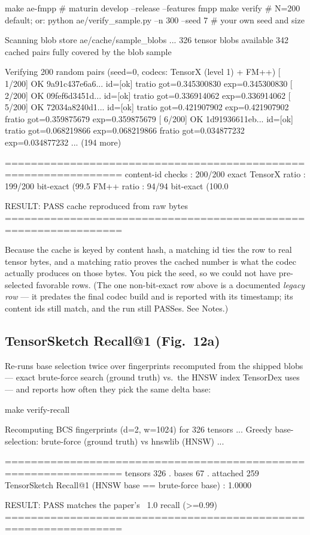 \documentclass[11pt]{article}
\begin{document}
\begin{shell}
make ae-fmpp             # maturin develop --release --features fmpp
make verify              # N=200 default; or:
python ae/verify_sample.py --n 300 --seed 7     # your own seed and size
\end{shell}
\begin{term}
Scanning blob store ae/cache/sample_blobs ...
  326 tensor blobs available
  342 cached pairs fully covered by the blob sample

Verifying 200 random pairs (seed=0, codecs: TensorX (level 1) + FM++)
  [  1/200] OK  9a91c437e6a6...  id=[ok]  tratio got=0.345300830 exp=0.345300830
  [  2/200] OK  09fef6d3451d...  id=[ok]  tratio got=0.336914062 exp=0.336914062
  [  5/200] OK  72034a8240d1...  id=[ok]  tratio got=0.421907902 exp=0.421907902
                                          fratio got=0.359875679 exp=0.359875679
  [  6/200] OK  1d91936611eb...  id=[ok]  tratio got=0.068219866 exp=0.068219866
                                          fratio got=0.034877232 exp=0.034877232
  ... (194 more)

================================================================
content-id checks : 200/200 exact
TensorX ratio     : 199/200 bit-exact (99.5%
FM++ ratio        : 94/94 bit-exact (100.0%

RESULT: PASS  cache reproduced from raw bytes
================================================================
\end{term}

Because the cache is keyed by content hash, a matching id ties the row to
real tensor bytes, and a matching ratio proves the cached number is what the
codec actually produces on those bytes. You pick the seed, so we could not
have pre-selected favorable rows. (The one non-bit-exact row above is a
documented \emph{legacy row} --- it predates the final codec build and is
reported with its timestamp; its content ids still match, and the run still
PASSes. See Notes.)

\subsection{TensorSketch Recall@1 (Fig.~12a)}

Re-runs base selection twice over fingerprints recomputed from the shipped
blobs --- exact brute-force search (ground truth) vs.\ the HNSW index
TensorDex uses --- and reports how often they pick the same delta base:

\begin{shell}
make verify-recall
\end{shell}
\begin{term}
Recomputing BCS fingerprints (d=2, w=1024) for 326 tensors ...
Greedy base-selection: brute-force (ground truth) vs hnswlib (HNSW) ...

================================================================
tensors 326  .  bases 67  .  attached 259
TensorSketch Recall@1 (HNSW base == brute-force base) : 1.0000

RESULT: PASS  matches the paper's ~1.0 recall (>=0.99)
================================================================
\end{term}
\end{document}
